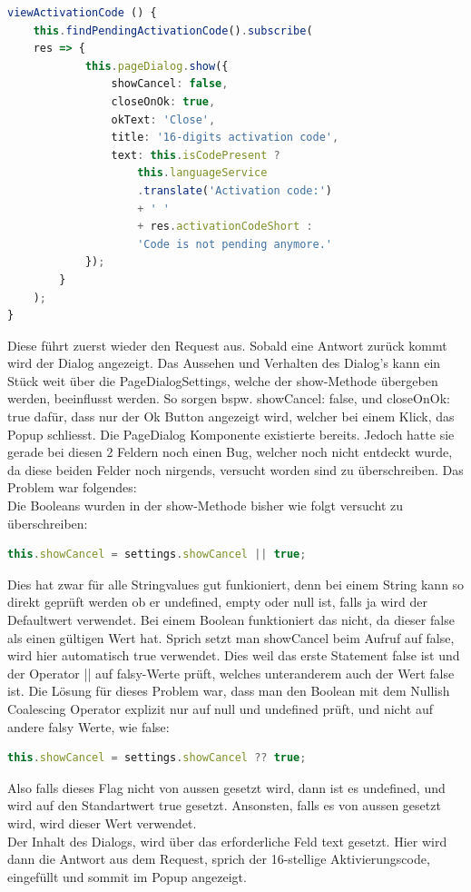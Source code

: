\begin{lstlisting}[language=TypeScript]
viewActivationCode () {
	this.findPendingActivationCode().subscribe(
	res => {
			this.pageDialog.show({
				showCancel: false,
				closeOnOk: true,
				okText: 'Close',
				title: '16-digits activation code',
				text: this.isCodePresent ?
					this.languageService
					.translate('Activation code:')
					+ ' '
					+ res.activationCodeShort :
					'Code is not pending anymore.'
			});
		}
	);
}
\end{lstlisting}
Diese führt zuerst wieder den Request aus. Sobald eine Antwort zurück kommt wird der Dialog angezeigt. Das Aussehen und Verhalten des Dialog's kann ein Stück weit über die PageDialogSettings, welche der show-Methode übergeben werden, beeinflusst werden. So sorgen bspw. showCancel: false, und closeOnOk: true dafür, dass nur der Ok Button angezeigt wird, welcher bei einem Klick, das Popup schliesst. Die PageDialog Komponente existierte bereits. Jedoch hatte sie gerade bei diesen 2 Feldern noch einen Bug, welcher noch nicht entdeckt wurde, da diese beiden Felder noch nirgends, versucht worden sind zu überschreiben. Das Problem war folgendes:\\
Die Booleans wurden in der show-Methode bisher wie folgt versucht zu überschreiben:
\begin{lstlisting}[language=TypeScript]
this.showCancel = settings.showCancel || true;
\end{lstlisting}
Dies hat zwar für alle Stringvalues gut funkioniert, denn bei einem String kann so direkt geprüft werden ob er undefined, empty oder null ist, falls ja wird der Defaultwert verwendet.
Bei einem Boolean funktioniert das nicht, da dieser false als einen gültigen Wert hat. Sprich setzt man showCancel beim Aufruf auf false, wird hier automatisch true verwendet. Dies weil das erste Statement false ist und der Operator || auf falsy-Werte prüft, welches unteranderem auch der Wert false ist. Die Lösung für dieses Problem war, dass man den Boolean mit dem Nullish Coalescing Operator explizit nur auf null und undefined prüft, und nicht auf andere falsy Werte, wie false:
\begin{lstlisting}[language=TypeScript]
this.showCancel = settings.showCancel ?? true;
\end{lstlisting}
Also falls dieses Flag nicht von aussen gesetzt wird, dann ist es undefined, und wird auf den Standartwert true gesetzt. Ansonsten, falls es von aussen gesetzt wird, wird dieser Wert verwendet.
\\
Der Inhalt des Dialogs, wird über das erforderliche Feld \flqq text\frqq{} gesetzt. Hier wird dann die Antwort aus dem Request, sprich der 16-stellige Aktivierungscode, eingefüllt und sommit im Popup angezeigt.
